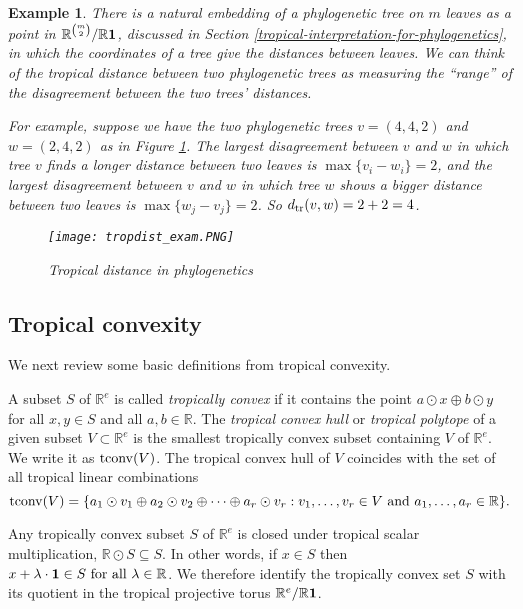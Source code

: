 \documentclass[12pt]{extarticle}
\numberwithin{theorem}{section}
\newtheorem{example}[theorem]{Example}
\newcommand{\RR}{\mathbb{R}}
\begin{document}
\begin{example} 
There is a natural embedding of a phylogenetic tree on $m$ leaves as a point in $\RR^{\binom{m}{2}}/\RR {\bf 1}$, discussed in Section \ref{tropical-interpretation-for-phylogenetics}, in which the coordinates of a tree give the distances between leaves. We can think of the tropical distance between two phylogenetic trees as measuring the ``range'' of the disagreement between the two trees' distances.

For example, suppose we have the two phylogenetic trees $v = (4, 4, 2)$ and $w = (2, 4, 2)$ as in Figure \ref{trop_dist_Xu}. The largest disagreement between $v$ and $w$ in which tree $v$ finds a longer distance between two leaves is $\max \{v_i - w_i\} = 2$, and the largest disagreement between $v$ and $w$ in which tree $w$ shows a bigger distance between two leaves is $\max\{w_j - v_j\} = 2$. So $d_{\rm tr}(v,w) = 2 + 2 = 4$.
\begin{figure}[!ht]
\centering
\texttt{[image: tropdist\_exam.PNG]}
\caption{Tropical distance in phylogenetics}
\label{trop_dist_Xu}
\end{figure}
\end{example}
\subsection{Tropical convexity}
\label{trop:conv}

We next review some basic definitions from tropical convexity.

A subset $S$ of $\RR^e$ is called \textit{tropically convex} if it contains the point $a \odot  x \oplus b \odot y$ for all $x,y
\in S$ and all $a, b \in \RR$. The \textit{tropical convex hull} or \textit{tropical polytope} of a given subset $V \subset \RR^e$ is the smallest tropically convex subset containing $V$ of $\RR^e$. We write it as ${\rm tconv}(V)$. The tropical convex hull of $V$ coincides with the set of all tropical linear combinations
$${\rm tconv}(V) = \{a_1 \odot v_1 \oplus a_2 \odot v_2 \oplus \cdots \oplus a_r \odot v_r : v_1,\ldots,v_r \in V \text{ and } a_1,\ldots,a_r \in \RR\}.$$

Any tropically convex subset $S$ of $\RR^e$ is closed under tropical
scalar multiplication, $\RR \odot S \subseteq S$. In other words, if $x
\in S$ then $x+\lambda \cdot {\bf 1} \in S \text{ for all } \lambda \in
\RR$. We therefore identify the tropically convex set $S$ with
its quotient in the tropical projective torus
$\RR^e/\RR {\bf 1}$.
\end{document}
